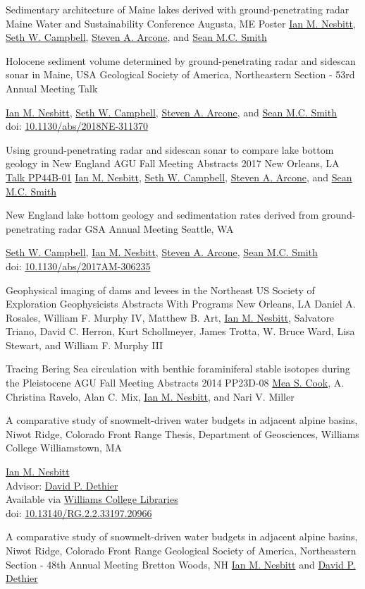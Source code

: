 \documentclass[a4paper,12pt,sans,colorlinks]{moderncv}
\newcommand{\me}{\href{https://www.iannesbitt.org}{Ian M. Nesbitt}}
\newcommand{\seth}{\href{https://www.alpinesciences.net}{Seth W. Campbell}}
\newcommand{\sean}{\href{https://umaine.edu/earthclimate/people/sean-m-c-smith/}{Sean M.C. Smith}}
\newcommand{\stevearcone}{\href{https://engineering.dartmouth.edu/community/faculty/steven-arcone}{Steven A. Arcone}}
\newcommand{\mea}{\href{https://geosciences.williams.edu/profile/msc1/}{Mea S. Cook}}
\newcommand{\david}{\href{https://geosciences.williams.edu/profile/ddethier/}{David P. Dethier}}
\newcommand{\agunola}{\href{https://agu.confex.com/agu/fm17/meetingapp.cgi/Paper/260265}{Talk PP44B-01}}
\newcommand{\williamsthesis}{\href{https://unbound.williams.edu/theses/islandora/object/studenttheses:766}{Williams College Libraries}}
\newcommand{\doi}[1]{%
    \href{https://doi.org/#1}{#1}
}
\begin{document}
{Sedimentary architecture of Maine lakes derived
with ground-penetrating radar}
{Maine Water and Sustainability Conference}
{Augusta, ME}
{Poster}
{
    \me{}, \seth{}, \stevearcone{}, and \sean{}
}

{Holocene sediment volume determined by
ground-penetrating radar and sidescan sonar in Maine, USA}
{Geological Society of America, Northeastern Section - 53rd Annual Meeting}
{}
{Talk}
{
    \me{}, \seth{}, \stevearcone{}, and \sean{}
    \\
    doi: \doi{10.1130/abs/2018NE-311370}
}

{Using ground-penetrating radar and sidescan sonar to
compare lake bottom geology in New England}
{AGU Fall Meeting Abstracts 2017}
{New Orleans, LA}
{\agunola}
{
    \me{}, \seth{}, \stevearcone{}, and \sean{}
}

{New England lake bottom geology and sedimentation
rates derived from ground-penetrating radar}
{GSA Annual Meeting}
{Seattle, WA}
{}
{
    \seth{}, \me{}, \stevearcone{}, \sean{}
    \\
    doi: \doi{10.1130/abs/2017AM-306235}
}

{Geophysical imaging of dams and levees in the Northeast US}
{Society of Exploration Geophysicists Abstracts With Programs}
{New Orleans, LA}
{}
{Daniel A. Rosales, William F. Murphy IV, Matthew B. Art,
\me, Salvatore Triano, David C. Herron, Kurt Schollmeyer,
James Trotta, W. Bruce Ward, Lisa Stewart, and William F.
Murphy III}

{Tracing Bering Sea circulation with benthic
foraminiferal stable isotopes during the Pleistocene}
{AGU Fall Meeting Abstracts 2014}
{}
{PP23D-08}
{
    \mea{}, A. Christina Ravelo, Alan C. Mix, \me{},
    and Nari V. Miller
}

{A comparative study of snowmelt-driven water budgets in
adjacent alpine basins, Niwot Ridge, Colorado Front Range}
{Thesis, Department of Geosciences, Williams College}
{Williamstown, MA}
{}
{
    \me{}
    \\
    Advisor: \david
    \\
    Available via \williamsthesis
    \\
    doi: \doi{10.13140/RG.2.2.33197.20966}
}

{A comparative study of snowmelt-driven water budgets in
adjacent alpine basins, Niwot Ridge, Colorado Front Range}
{Geological Society of America, Northeastern Section - 48th Annual Meeting}
{Bretton Woods, NH}
{}
{
    \me{} and \david{}
}
\end{document}

